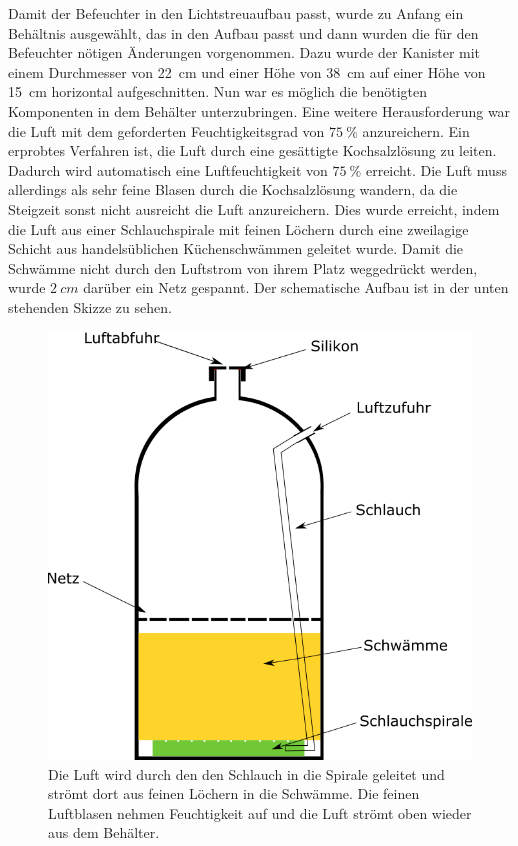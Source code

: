 Damit der Befeuchter in den Lichtstreuaufbau passt, wurde zu Anfang ein Behältnis ausgewählt, das in den Aufbau passt und dann wurden die für den Befeuchter nötigen Änderungen vorgenommen. Dazu wurde der Kanister mit einem Durchmesser von \SI{22}{cm} und einer Höhe von \SI{38}{cm} auf einer Höhe von \SI{15}{cm} horizontal aufgeschnitten. Nun war es möglich die benötigten Komponenten in dem Behälter unterzubringen. Eine weitere Herausforderung war die Luft mit dem geforderten Feuchtigkeitsgrad von $\SI{75}{\%}$ anzureichern. Ein erprobtes Verfahren ist, die Luft durch eine gesättigte Kochsalzlösung zu leiten. Dadurch wird automatisch eine Luftfeuchtigkeit von $\SI{75}{\%}$ erreicht. Die Luft muss allerdings als sehr feine Blasen durch die Kochsalzlösung wandern, da die Steigzeit sonst nicht ausreicht die Luft anzureichern. 
Dies wurde erreicht, indem die Luft aus einer Schlauchspirale mit feinen Löchern durch eine zweilagige Schicht aus handelsüblichen Küchenschwämmen geleitet wurde.
Damit die Schwämme nicht durch den Luftstrom von ihrem Platz weggedrückt werden, wurde $\SI{2}{cm}$ darüber ein Netz gespannt. Der schematische Aufbau ist in der unten stehenden Skizze zu sehen. \\

\begin{figure}[h!]
	\begin{center}
		\includegraphics[scale=0.5]{Luftbefeuchter.png}
		\caption[Schema Luftbefeuchter]{Die Luft wird durch den den Schlauch in die Spirale geleitet und strömt dort aus feinen Löchern in die Schwämme. Die feinen Luftblasen nehmen Feuchtigkeit auf und die Luft strömt oben wieder aus dem Behälter.}
	\end{center}
\end{figure}

